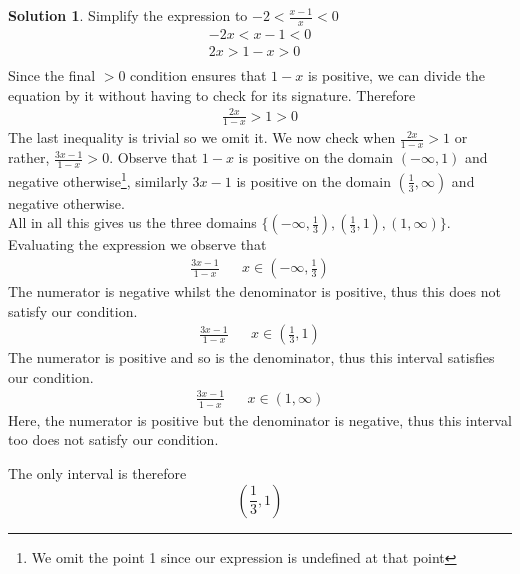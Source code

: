 \documentclass[a4paper]{article}
\theoremstyle{definition}
\newtheorem*{solution}{Solution}
\begin{document}
\begin{solution}
Simplify the expression to \(-2 < \frac{x-1}{x} < 0\)
\begin{align*}
-2x < x -1 < 0 \\
2x > 1-x > 0 \\
\end{align*}
Since the final \(> 0\) condition ensures that \(1-x\) is positive, we can divide the equation by it without having to check for its signature. Therefore
\begin{align*}
\frac{2x}{1-x} > 1 > 0
\end{align*}
The last inequality is trivial so we omit it. We now check when \(\frac{2x}{1-x} > 1\) or rather, \(\frac{3x-1}{1-x} > 0\). Observe that \(1-x\) is positive on the domain \((-\infty, 1)\) and negative otherwise\footnote{We omit the point 1 since our expression is undefined at that point}, similarly \(3x-1\) is positive on the domain \((\frac{1}{3}, \infty)\) and negative otherwise. \\ 

All in all this gives us the three domains \(\{(-\infty, \frac{1}{3}), (\frac{1}{3}, 1), (1, \infty)\}\). Evaluating the expression we observe that 
\begin{align*}
\frac{3x-1}{1-x} && x \in \left(-\infty, \frac{1}{3}\right)
\end{align*}
The numerator is negative whilst the denominator is positive, thus this does not satisfy our condition.
\begin{align*}
\frac{3x-1}{1-x} && x \in \left(\frac{1}{3}, 1\right)
\end{align*}
The numerator is positive and so is the denominator, thus this interval satisfies our condition.
\begin{align*}
\frac{3x-1}{1-x} && x \in (1, \infty)
\end{align*}
Here, the numerator is positive but the denominator is negative, thus this interval too does not satisfy our condition.

The only interval is therefore 
\[
\left(\frac{1}{3}, 1\right)
\]

\end{solution}
\end{document}
